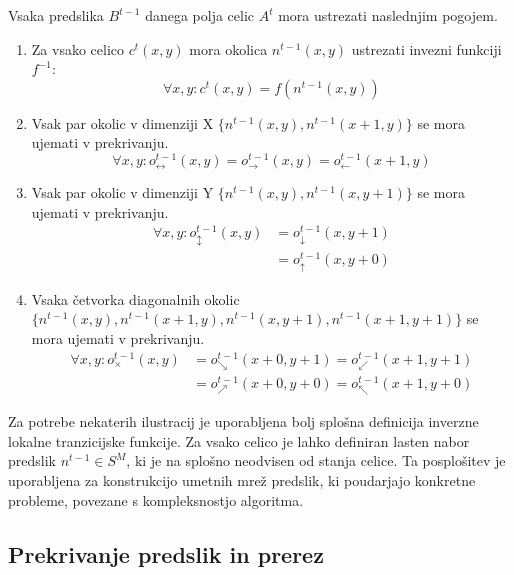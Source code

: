 \documentclass[12pt,a4paper,openany,twoside]{book}
\begin{document}
Vsaka predslika \(B^{t-1}\) danega polja celic \(A^t\) mora ustrezati naslednjim pogojem.
\begin{enumerate}
\item Za vsako celico \(c^{t}(x,y)\) mora okolica \(n^{t-1}(x,y)\) ustrezati invezni funkciji \(f^{-1}\):
\begin{equation}
\forall x,y : c^{t}(x,y) = f(n^{t-1}(x,y))
\end{equation}
\item Vsak par okolic v dimenziji X \(\{n^{t-1}(x,y), n^{t-1}(x+1,y)\}\) se mora ujemati v prekrivanju.
\begin{equation}
\forall x,y : o_{\leftrightarrow}^{t-1}(x,y) = o_{\rightarrow}^{t-1}(x,y) = o_{\leftarrow}^{t-1}(x+1,y)
\end{equation}
\item Vsak par okolic v dimenziji Y \(\{n^{t-1}(x,y), n^{t-1}(x,y+1)\}\) se mora ujemati v prekrivanju.
\begin{equation}
\begin{align}
\forall x,y : o_{\updownarrow}^{t-1}(x,y) &= o_{\downarrow}^{t-1}(x,y+1) \\
                                          &= o_{\uparrow}  ^{t-1}(x,y+0)
\end{align}
\end{equation}
\item Vsaka četvorka diagonalnih okolic \(\{n^{t-1}(x,y), n^{t-1}(x+1,y), n^{t-1}(x,y+1), n^{t-1}(x+1,y+1)\}\) se mora ujemati v prekrivanju.
\begin{equation}
\begin{align}
\forall x,y : o_{\times}^{t-1}(x,y) &= o_{\searrow}^{t-1}(x+0,y+1) = o_{\swarrow}^{t-1}(x+1,y+1) \\
                                    &= o_{\nearrow}^{t-1}(x+0,y+0) = o_{\nwarrow}^{t-1}(x+1,y+0)
\end{align}
\end{equation}
\end{enumerate}

Za potrebe nekaterih ilustracij je uporabljena bolj splošna definicija inverzne lokalne tranzicijske funkcije.
Za vsako celico je lahko definiran lasten nabor predslik \(n^{t-1} \in S^M\),
ki je na splošno neodvisen od stanja celice.
Ta posplošitev je uporabljena za konstrukcijo umetnih mrež predslik,
ki poudarjajo konkretne probleme, povezane s kompleksnostjo algoritma.

\subsection{Prekrivanje predslik in prerez}
\end{document}

